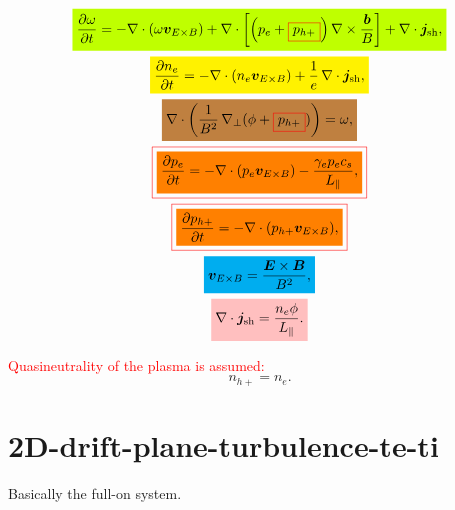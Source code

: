 \documentclass{article}
\makeatletter
\newcommand{\mathcolorbox}[2]{\colorbox{#1}{$\displaystyle #2$}}
\newcommand*{\colorboxed}{}
\def\colorboxed#1#{\colorboxedAux{#1}}
\newcommand*{\colorboxedAux}[3]{
    \begingroup
        \colorlet{cb@saved}{.}
        \color#1{#2}
        \boxed{\color{cb@saved}#3}
    \endgroup
}
\makeatother
\begin{document}
\begin{gather}
    \mathcolorbox{lime}{ \frac{\partial\omega}{\partial t} = - \nabla \cdot (\omega \bm{v}_{E \times B}) + \nabla \cdot \left[ \left( p_e + \colorboxed{red}{p_{h+}} \right) \nabla \times \frac{\bm{b}}{B} \right] + \nabla \cdot \bm{j}_\text{sh} , } \\
    \mathcolorbox{yellow}{ \frac{\partial n_e}{\partial t} = - \nabla \cdot (n_e \bm{v}_{E \times B}) + \frac{1}{e} \, \nabla \cdot \bm{j}_\text{sh} , } \\
    \mathcolorbox{brown}{ \nabla \cdot \left( \frac{1}{B^2} \, \nabla_\perp (\phi + \colorboxed{red}{p_{h+}}) \right) = \omega , } \\
    \colorboxed{red}{ \mathcolorbox{orange}{ \frac{\partial p_e}{\partial t} = - \nabla \cdot (p_e \bm{v}_{E \times B}) - \frac{\gamma_e p_e c_s}{L_\parallel} , } } \\
    \colorboxed{red}{ \mathcolorbox{orange}{ \frac{\partial p_{h+}}{\partial t} = - \nabla \cdot (p_{h+} \bm{v}_{E \times B}) , } } \\
    \mathcolorbox{cyan}{ \bm{v}_{E \times B} = \frac{\bm{E} \times\bm{B}}{B^2} , } \\
    \mathcolorbox{pink}{ \nabla \cdot \bm{j}_\text{sh} = \frac{n_e \phi}{L_\parallel} . }
\end{gather}

\textcolor{red}{Quasineutrality of the plasma is assumed:}
%
\begin{equation}
    n_{h+} = n_e .
\end{equation}

\newpage

\section{2D-drift-plane-turbulence-te-ti}

Basically the full-on system.
\end{document}
